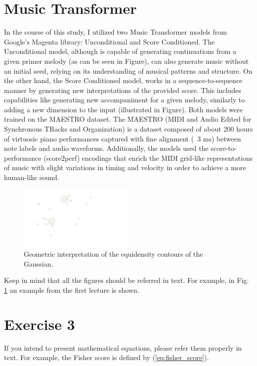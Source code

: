 \documentclass[twocolumn]{article}
\begin{document}
\section{Music Transformer}
In the course of this study, I utilized two Music Transformer models from Google's Magenta library: Unconditional and Score Conditioned. The Unconditional model, although is capable of generating continuations from a given primer melody (as can be seen in Figure), can also generate music without an initial seed, relying on its understanding of musical patterns and structure. On the other hand, the Score Conditioned model, works in a sequence-to-sequence manner by generating new interpretations of the provided score. This includes capabilities like generating new accompaniment for a given melody, similarly to adding a new dimension to the input (illustrated in Figure). Both models were trained on the MAESTRO dataset. The MAESTRO (MIDI and Audio Edited for Synchronous TRacks and Organization) is a dataset composed of about 200 hours of virtuosic piano performances captured with fine alignment (~3 ms) between note labels and audio waveforms. Additionally, the models used the score-to-performance (score2perf) encodings that enrich the MIDI grid-like representations of music with slight variations in timing and velocity in order to achieve a more human-like sound.
\begin{figure}[h]
	\centering
	\includegraphics[width=0.49\textwidth]{classification.pdf}
	\caption{Geometric interpretation of the equidensity contours of the Gaussian.}
	\label{fig:example}
\end{figure}
Keep in mind that all the figures should be referred in text. For example, in Fig. \ref{fig:example} an example from the first lecture is shown.

\section{Exercise 3}
If you intend to present mathematical equations, please refer them properly in text. For example, the Fisher score is defined by (\ref{eq:fisher_score}).
\end{document}
